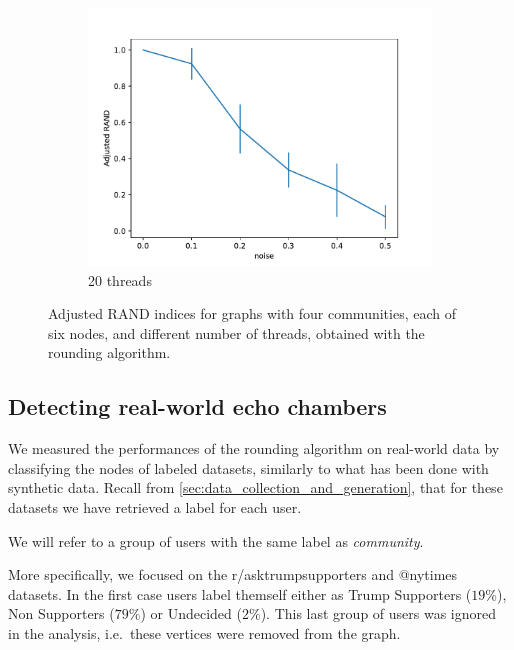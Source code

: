 \begin{figure}
\begin{center}
		\begin{subfigure}[b]{0.3\textwidth}
			\centering
			\includegraphics[width=\textwidth]{tex/out/synthetic_20t/model2_noise_adj_rand.pdf}
			\caption{20 threads}
			\label{fig:tex/out/synthetic_8t/model2_noise_adj_rand.pdf}
		\end{subfigure}
	\end{center}
	\caption{Adjusted RAND indices for graphs with four communities, each of
		six nodes, and different number of threads, obtained with the rounding
		algorithm.}
	\label{fig:clustering-threads}
\end{figure}

\subsection{Detecting real-world echo chambers}%
\label{sub:detecting_real_echo_chambers}

We measured the performances of the rounding algorithm on real-world data by
classifying the nodes of labeled datasets, similarly to what has been done
with synthetic data. Recall from \autoref{sec:data_collection_and_generation},
that for these datasets we have retrieved a label for each user.

We will refer to a group of users with the same label as \emph{community}.

More specifically, we focused on the r/asktrumpsupporters and
@nytimes datasets. In the first case users label themself either as Trump Supporters ($19\%$), Non
Supporters ($79\%$) or Undecided ($2\%$). This last group of users was ignored
in the analysis, i.e.\ these vertices were removed from the graph.

